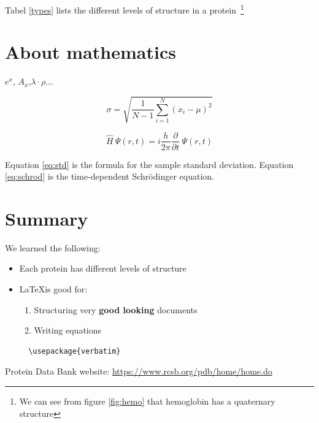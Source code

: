 \documentclass[a4paper,12pt,twoside]{article}
\begin{document}
Tabel \ref{types} lists the different levels of structure in a protein~\footnote{We can see from figure \ref{fig:hemo} that hemoglobin has a quaternary structure}

\section{About mathematics}
\label{sec:math}
$e^x$, $A_x$,$\lambda \cdot \rho \ldots $

\begin{equation}
 \sigma= \sqrt{ \frac{1}{N-1} \sum \limits_{i=1}^N (x_i-\mu)^2}
 \label{eq:std}
\end{equation}

\begin{equation}
\hat{H}~\Psi(r,t) = i \frac{h}{2\pi}\frac{\partial}{\partial{t}}~\Psi(r,t)
\label{eq:schrod}
\end{equation}

Equation \ref{eq:std} is the formula for the sample standard deviation.
Equation \ref{eq:schrod} is the time-dependent Schr\"odinger equation.

\section{Summary}
\label{sec:sum}
We learned the following:
\begin{itemize}
 \item Each protein has different levels of structure
 \item \LaTeX is good for:
 \begin{enumerate}
  \item Structuring very \textbf {good looking} documents
  \item Writing equations
 \end{enumerate}
 
 \begin{verbatim}
  \usepackage{verbatim}
 \end{verbatim}


\end{itemize}


\begin{thebibliography}{99}
  Protein Data Bank website: \url{https://www.rcsb.org/pdb/home/home.do}
\end{thebibliography}

 
 
\end{document}
